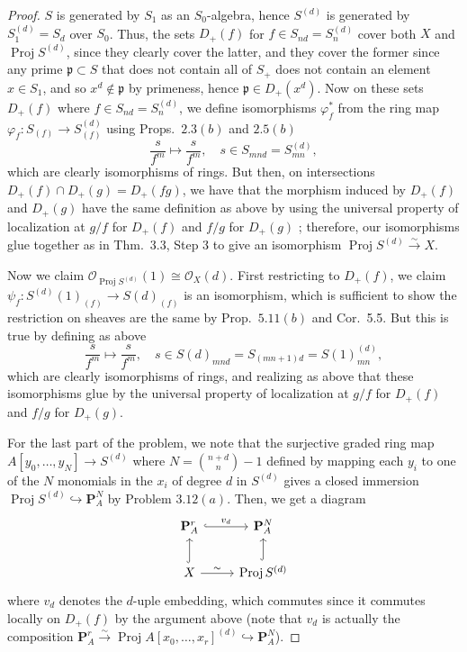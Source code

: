 \documentclass[12pt,letterpaper]{article}
\theoremstyle{definition}
\theoremstyle{remark}
\numberwithin{equation}{section}
\numberwithin{figure}{problem}
\DeclareMathOperator{\Proj}{Proj}
\newcommand{\OO}{\mathcal{O}}
\newcommand{\isoto}{\overset{\sim}{\to}}
\begin{document}
\begin{proof}
  $S$ is generated by $S_1$ as an $S_0$-algebra, hence $S^{(d)}$ is generated by $S_1^{(d)} = S_d$ over $S_0$. Thus, the sets $D_+(f)$ for $f \in S_{nd} = S_n^{(d)}$ cover both $X$ and $\Proj S^{(d)}$, since they clearly cover the latter, and they cover the former since any prime $\mathfrak{p} \subset S$ that does not contain all of $S_+$ does not contain an element $x \in S_1$, and so $x^{d} \notin \mathfrak{p}$ by primeness, hence $\mathfrak{p} \in D_+(x^d)$. Now on these sets $D_+(f)$ where $f \in S_{nd} = S_n^{(d)}$, we define isomorphisms $\varphi_f^*$ from the ring map $\varphi_f\colon S_{(f)} \to S^{(d)}_{(f)}$ using Props.~$2.3(b)$ and $2.5(b)$
  \begin{equation*}
    \frac{s}{f^m} \mapsto \frac{s}{f^m}, \quad s \in S_{mnd} = S_{mn}^{(d)},
  \end{equation*}
  which are clearly isomorphisms of rings. But then, on intersections $D_+(f) \cap D_+(g) = D_+(fg)$, we have that the morphism induced by $D_+(f)$ and $D_+(g)$ have the same definition as above by using the universal property of localization at $g/f$ for $D_+(f)$ and $f/g$ for $D_+(g)$ \cite[Prop.~3.1]{AM69}; therefore, our isomorphisms glue together as in Thm.~3.3, Step 3 to give an isomorphism $\Proj S^{(d)} \isoto X$.
  \par Now we claim $\OO_{\Proj S^{(d)}}(1) \cong \OO_X(d)$. First restricting to $D_+(f)$, we claim $\psi_f \colon S^{(d)}(1)_{(f)} \to S(d)_{(f)}$ is an isomorphism, which is sufficient to show the restriction on sheaves are the same by Prop.~$5.11(b)$ and Cor.~5.5. But this is true by defining as above
  \begin{equation*}
    \frac{s}{f^m} \mapsto \frac{s}{f^m}, \quad s \in S(d)_{mnd} = S_{(mn+1)d} = S(1)_{mn}^{(d)},
  \end{equation*}
  which are clearly isomorphisms of rings, and realizing as above that these isomorphisms glue by the universal property of localization at $g/f$ for $D_+(f)$ and $f/g$ for $D_+(g)$.
  \par For the last part of the problem, we note that the surjective graded ring map $A[y_0,\ldots,y_N] \to S^{(d)}$ where $N = \binom{n+d}{n} - 1$ defined by mapping each $y_i$ to one of the $N$ monomials in the $x_i$ of degree $d$ in $S^{(d)}$ gives a closed immersion $\Proj S^{(d)} \hookrightarrow \mathbf{P}^N_A$ by Problem $3.12(a)$. Then, we get a diagram
  \begin{equation*}
    \begin{tikzcd}
      \mathbf{P}^r_A \rar[hook]{v_d} & \mathbf{P}^N_A\\
      X \rar{\sim} \uar[hook] & \Proj S^{(d)} \uar[hook]
    \end{tikzcd}
  \end{equation*}
  where $v_d$ denotes the $d$-uple embedding, which commutes since it commutes locally on $D_+(f)$ by the argument above (note that $v_d$ is actually the composition $\mathbf{P}^r_A \isoto \Proj A[x_0,\ldots,x_r]^{(d)} \hookrightarrow \mathbf{P}^N_A$).
\end{proof}
\end{document}
